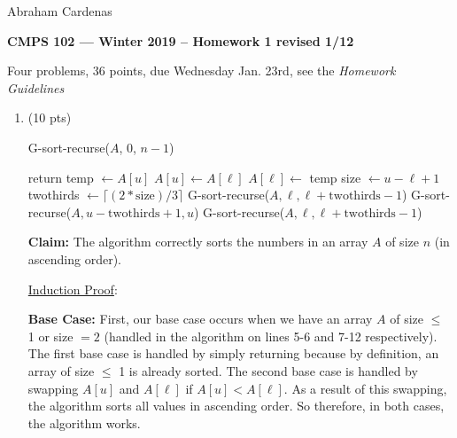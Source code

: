 \documentclass[11pt]{article}
\begin{document}
\hfill Abraham Cardenas

\begin{center}
{\bf\Large CMPS 102 --- Winter 2019 --  Homework 1 \normalsize revised 1/12}
\end{center}

\begin{center}
Four problems, 36 points, due Wednesday Jan. 23rd, see the \emph{Homework Guidelines} 
\end{center}


\renewcommand{\P}{\mbox{IH}}

\begin{enumerate}

\item (10 pts) \- \
\begin{algorithmic}[1]
 
	\State G-sort-recurse($A$, 0, $n-1$)
\EndFunction

\If {$u - \ell \leq 0$} 
	\State return 
 
	 
		\State  temp $\gets A[u]$
		\State $A[u] \gets A[\ell]$
		\State $A[\ell] \gets$ temp
	\EndIf
\Else {}
\State size $\gets u - \ell + 1$
\State twothirds $\gets \lceil (2 * \mbox{size})  / 3 \rceil$
\State G-sort-recurse($A, \ell, \ell + \mbox{twothirds} - 1$)
\State G-sort-recurse($A, u - \mbox{twothirds}+1 , u$)
\State G-sort-recurse($A, \ell, \ell + \mbox{twothirds} - 1$)
\EndIf 
\EndFunction
\end{algorithmic}

{\bf Claim:} The algorithm correctly sorts the numbers in an array $A$ of size $n$ (in ascending order).

\underline{Induction Proof}:

{\bf Base Case:} First, our base case occurs when we have an array $A$ of size $\leq$ 1 or size $= 2$ (handled in the algorithm on lines 5-6 and 7-12 respectively). The first base case is handled by simply returning because by definition, an array of size $\leq$ 1 is already sorted. The second base case is handled by swapping $A[u]$ and $A[\ell]$ if $A[u] < A[\ell]$. As a result of this swapping, the algorithm sorts all values in ascending order. So therefore, in both cases, the algorithm works.


\end{enumerate}
\end{document}
